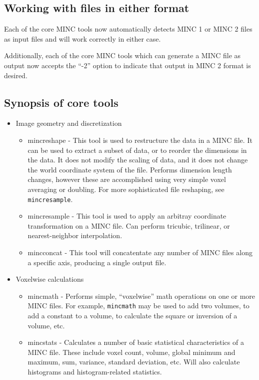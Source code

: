 \documentclass{article}
\begin{document}
\subsection{Working with files in either format}
Each of the core MINC tools now automatically detects MINC 1 or MINC 2
files as input files and will work correctly in either case.

Additionally, each of the core MINC tools which can generate a MINC file
as output now accepts the ``-2'' option
to indicate that output in MINC 2 format is desired.

\subsection{Synopsis of core tools}
\begin{itemize}
\item Image geometry and discretization
\begin{itemize}
\item mincreshape - This tool is used to restructure the data in a MINC
file.  It can be used to extract a subset of data, or to reorder the 
dimensions in the data.  It does not modify the scaling of data, and it
does not change the world coordinate system of the file.  Performs dimension
length changes, however these are accomplished using very simple voxel
averaging or doubling.  For more sophisticated file reshaping, see
{\tt mincresample}.
\item mincresample - This tool is used to apply an arbitray coordinate
transformation on a MINC file.  Can perform tricubic, trilinear, or
nearest-neighbor interpolation.
\item mincconcat - This tool will concatentate any number of MINC
files along a specific axis, producing a single output file.
\end{itemize}
\item Voxelwise calculations
\begin{itemize}
\item mincmath - Performs simple, ``voxelwise'' math operations
on one or more MINC files.  For example, {\tt mincmath} may be used
to add two volumes, to add a constant to a volume, to calculate the
square or inversion of a volume, etc.
\item mincstats - Calculates a number of basic statistical
characteristics of a MINC file.  These include voxel count, volume,
global minimum and maximum, sum, variance, standard deviation, etc.
Will also calculate histograms and histogram-related statistics.

\end{itemize}
\end{itemize}
\end{document}
